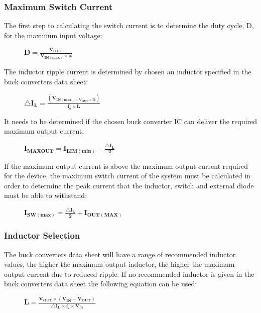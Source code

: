 \subsubsection{Maximum Switch Current}
\vspace{-6mm}
The first step to calculating the switch current is to determine the duty cycle, D, for the maximum input voltage:
\vspace{-5mm}
\begin{figure}[H]
    \centering
    $\mathbf{D = \frac{V_{OUT}}{V_{IN(max)}\times \mu}}$
\end{figure}
\vspace{-5mm}
The inductor ripple current is determined by chosen an inductor specified in the buck converters data sheet:
\vspace{-5mm}
\begin{figure}[H]
    \centering
    $\mathbf{\triangle I_L = \frac{(V_{IN(max)-V_{OUT}\times D})}{f_s\times L}}$ 
\end{figure}
\vspace{-5mm}
It needs to be determined if the chosen buck converter IC can deliver the required maximum output current:
\vspace{-5mm}
\begin{figure}[H]
    \centering
    $\mathbf{I_{MAXOUT} = I_{LIM(min)} - \frac{\triangle  I_L}{2}}$
\end{figure}
\vspace{-6mm}
If the maximum output current is above the maximum output current required for the device, the maximum switch current of the system must be calculated in order to determine the peak current that the inductor, switch and external diode must be able to withstand: 
\vspace{-5mm}
\begin{figure}[H]
    \centering
    $\mathbf{I_{SW(max)} = \frac{\triangle I_L}{2} + I_{OUT(MAX)}}$ 
\end{figure}
\vspace{-5mm}

\subsubsection{Inductor Selection}
\vspace{-6mm}
The buck converters data sheet will have a range of recommended inductor values, the higher the maximum output inductor, the higher the maximum output current due to reduced ripple. If no recommended inductor is given in the buck converters data sheet the following equation can be used:
\begin{figure}[H]
    \centering
    $\mathbf{L = \frac{V_{OUT} \times(V_{IN} - V_{OUT})}{ \triangle I_L \times{f_s} \times{ V_{in}}}}$
\end{figure}


